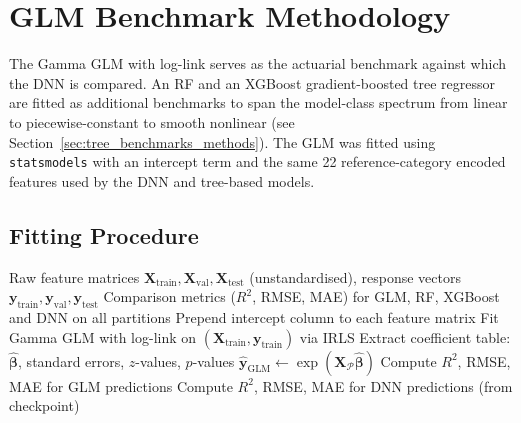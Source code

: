 \section{GLM Benchmark Methodology}
\label{annexure:glm_benchmark}

The Gamma GLM with log-link serves as the actuarial benchmark against which the DNN is compared.  An RF and an XGBoost gradient-boosted tree regressor are fitted as additional benchmarks to span the model-class spectrum from linear to piecewise-constant to smooth nonlinear (see Section~\ref{sec:tree_benchmarks_methods}).  The GLM was fitted using \texttt{statsmodels} with an intercept term and the same 22 reference-category encoded features used by the DNN and tree-based models.

\subsection{Fitting Procedure}
\label{annexure:glm_fit}

\begin{algorithm}[htbp]
\caption{GLM benchmark fitting and comparison.}
\label{alg:glm_benchmark}
\begin{algorithmic}[1]
\Require Raw feature matrices $\mathbf{X}_{\mathrm{train}}, \mathbf{X}_{\mathrm{val}}, \mathbf{X}_{\mathrm{test}}$ (unstandardised), response vectors $\mathbf{y}_{\mathrm{train}}, \mathbf{y}_{\mathrm{val}}, \mathbf{y}_{\mathrm{test}}$
\Ensure Comparison metrics (\ensuremath{R^2}, RMSE, MAE) for GLM, RF, XGBoost and DNN on all partitions
\State Prepend intercept column to each feature matrix
\State Fit Gamma GLM with log-link on $(\mathbf{X}_{\mathrm{train}}, \mathbf{y}_{\mathrm{train}})$ via IRLS
\State Extract coefficient table: $\hat{\boldsymbol{\beta}}$, standard errors, $z$-values, $p$-values
    \State $\hat{\mathbf{y}}_{\mathrm{GLM}} \gets \exp(\mathbf{X}_{\mathcal{P}} \hat{\boldsymbol{\beta}})$
    \State Compute \ensuremath{R^2}, RMSE, MAE for GLM predictions
    \State Compute \ensuremath{R^2}, RMSE, MAE for DNN predictions (from checkpoint)
\EndFor
\end{algorithmic}
\end{algorithm}

